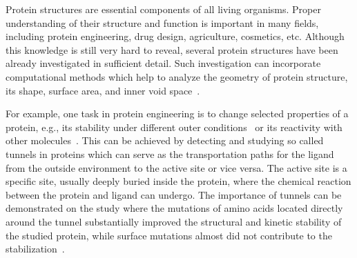 \documentclass[usletter, 10pt, conference]{svjour3}      %
\begin{document}
Protein structures are essential components of all living organisms.
Proper understanding of their structure and function is important in many fields, including protein engineering, drug design, agriculture, cosmetics, etc.
Although this knowledge is still very hard to reveal, several protein structures have been already investigated in sufficient detail. 
Such investigation can incorporate computational methods which help to analyze the geometry of protein structure,  its shape, surface area, and inner void space~\cite{gora2013gates}.

For example, one task in protein engineering is to change selected properties of a protein, e.g., its stability under different outer conditions~\cite{Koudelakova2013} or its reactivity with other molecules~\cite{Pavlova2009}.
This can be achieved by detecting and studying so called tunnels in proteins which can serve as the transportation paths for the 
ligand from the outside environment to the active site or vice versa. 
The active site is a specific site, usually deeply buried inside the protein, where the chemical reaction between the protein and ligand can undergo. 
The importance of tunnels can be demonstrated on the study where the mutations of amino acids located directly around the tunnel substantially improved the structural and kinetic stability of the studied protein, while surface mutations almost did not contribute to the stabilization~\cite{Koudelakova2013}.

\end{document}
